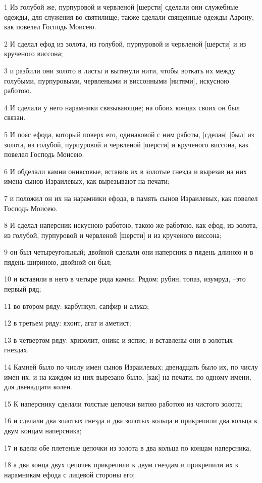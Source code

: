 \par 1 Из голубой же, пурпуровой и червленой [шерсти] сделали они служебные одежды, для служения во святилище; также сделали священные одежды Аарону, как повелел Господь Моисею.
\par 2 И сделал ефод из золота, из голубой, пурпуровой и червленой [шерсти] и из крученого виссона;
\par 3 и разбили они золото в листы и вытянули нити, чтобы воткать их между голубыми, пурпуровыми, червлеными и виссонными [нитями], искусною работою.
\par 4 И сделали у него нарамники связывающие; на обоих концах своих он был связан.
\par 5 И пояс ефода, который поверх его, одинаковой с ним работы, [сделан] [был] из золота, из голубой, пурпуровой и червленой [шерсти] и крученого виссона, как повелел Господь Моисею.
\par 6 И обделали камни ониксовые, вставив их в золотые гнезда и вырезав на них имена сынов Израилевых, как вырезывают на печати;
\par 7 и положил он их на нарамники ефода, в память сынов Израилевых, как повелел Господь Моисею.
\par 8 И сделал наперсник искусною работою, такою же работою, как ефод, из золота, из голубой, пурпуровой и червленой [шерсти] и из крученого виссона;
\par 9 он был четыреугольный; двойной сделали они наперсник в пядень длиною и в пядень шириною, двойной он был;
\par 10 и вставили в него в четыре ряда камни. Рядом: рубин, топаз, изумруд, --это первый ряд;
\par 11 во втором ряду: карбункул, сапфир и алмаз;
\par 12 в третьем ряду: яхонт, агат и аметист;
\par 13 в четвертом ряду: хризолит, оникс и яспис; и вставлены они в золотых гнездах.
\par 14 Камней было по числу имен сынов Израилевых: двенадцать было их, по числу имен их, и на каждом из них вырезано было, [как] на печати, по одному имени, для двенадцати колен.
\par 15 К наперснику сделали толстые цепочки витою работою из чистого золота;
\par 16 и сделали два золотых гнезда и два золотых кольца и прикрепили два кольца к двум концам наперсника;
\par 17 и вдели обе плетеные цепочки из золота в два кольца по концам наперсника,
\par 18 а два конца двух цепочек прикрепили к двум гнездам и прикрепили их к нарамникам ефода с лицевой стороны его;
